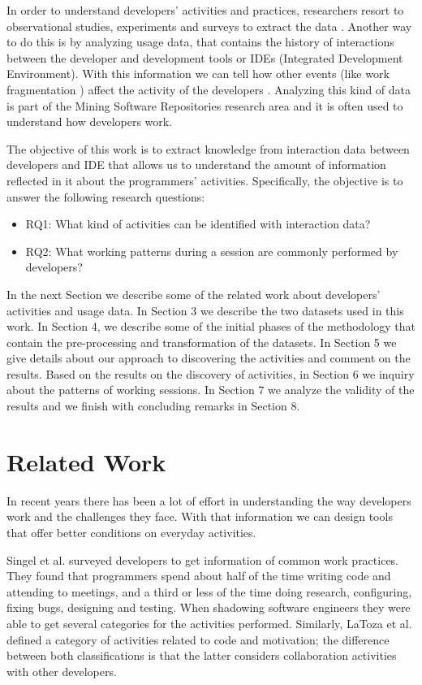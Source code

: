 \documentclass[conference]{IEEEtran}
\begin{document}
In order to understand developers' activities and practices, researchers resort to observational studies, experiments and surveys to extract the data \cite{LVD06, KMC06, GM04, PR11}. Another way to do this is by analyzing usage data, that contains the history of interactions between the developer and development tools or IDEs (Integrated Development Environment). With this information we can tell how other events (like work fragmentation \cite{SRV15}) affect the activity of the developers \cite{SnipesETALASD}. Analyzing this kind of data is part of the Mining Software Repositories research area \cite{H04} and it is often used to understand how developers work.

The objective of this work is to extract knowledge from interaction data between developers and IDE that allows us to understand the amount of information reflected in it about the programmers' activities. Specifically, the objective is to answer the following research questions:
\begin{itemize}
	\item RQ1: What kind of activities can be identified with interaction data?
	\item RQ2: What working patterns during a session are commonly performed by developers?
\end{itemize}

In the next Section we describe some of the related work about developers' activities and usage data. In Section 3 we describe the two datasets used in this work. In Section 4, we describe some of the initial phases of the methodology that contain the pre-processing and transformation of the datasets. In Section 5 we give details about our approach to discovering the activities and comment on the results. Based on the results on the discovery of activities, in Section 6 we inquiry about the patterns of working sessions. In Section 7 we analyze the validity of the results and we finish with concluding remarks in Section 8.
\section{Related Work}
In recent years there has been a lot of effort in understanding the way developers work and the challenges they face. With that information we can design tools \cite{CD10, P14, CLQ15, KM06} that offer better conditions on everyday activities. 

Singel et al. \cite{SLV10} surveyed developers to get information of common work practices. They found that programmers spend about half of the time writing code and attending to meetings, and a third or less of the time doing research, configuring, fixing bugs, designing and testing. When shadowing software engineers they were able to get several categories for the activities performed. Similarly, LaToza et al. \cite{LVD06} defined a category of activities related to code and motivation; the difference between both classifications is that the latter considers collaboration activities with other developers.
\end{document}
